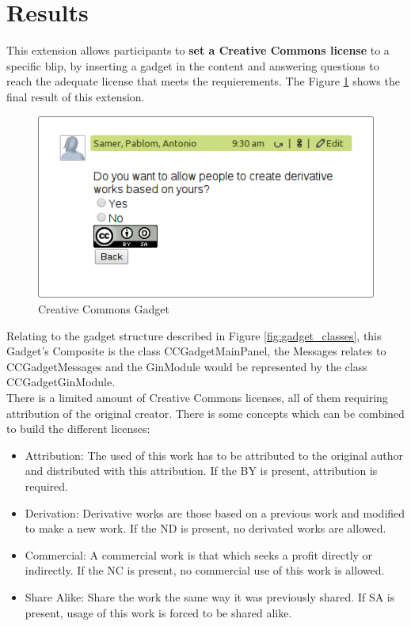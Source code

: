 \section{Results}
This extension allows participants to \textbf{set a Creative Commons license} to a specific blip, by inserting a gadget in the content and answering questions to reach the adequate license that meets the requierements. The Figure \ref{fig:cc_gadget} shows the final result of this extension.
\begin{figure}[h]
  \center
    \includegraphics[keepaspectratio, scale=0.7]{Media/Captures/Extensions/CCGadget.png}
  \caption{Creative Commons Gadget}
  \label{fig:cc_gadget}
\end{figure}
Relating to the gadget structure described in Figure \ref{fig:gadget_classes}, this Gadget's Composite is the class CCGadgetMainPanel, the Messages relates to CCGadgetMessages and the GinModule would be represented by the class CCGadgetGinModule.\\[.2cm]
There is a limited amount of Creative Commons licenses, all of them requiring attribution of the original creator. There is some concepts which can be combined to build the different licenses:
\begin{itemize}
  \item Attribution: The used of this work has to be attributed to the original author and distributed with this attribution. If the BY is present, attribution is required.
  \item Derivation: Derivative works are those based on a previous work and modified to make a new work. If the ND is present, no derivated works are allowed.
  \item Commercial: A commercial work is that which seeks a profit directly or indirectly. If the NC is present, no commercial use of this work is allowed.
  \item Share Alike: Share the work the same way it was previously shared. If SA is present, usage of this work is forced to be shared alike.
\end{itemize}
